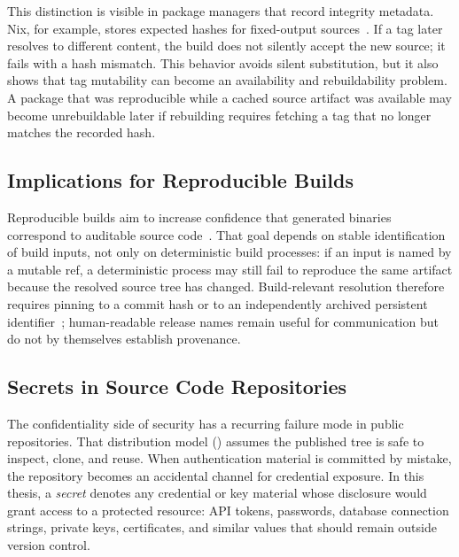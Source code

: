 This distinction is visible in package managers that record integrity metadata.
Nix, for example, stores expected hashes for fixed-output sources~\cite{DBLP:conf/lisa/DolstraJV04}.
If a tag later resolves to different content, the build does not silently accept the new source; it fails with a hash mismatch.
This behavior avoids silent substitution, but it also shows that tag mutability can become an availability and rebuildability problem.
A package that was reproducible while a cached source artifact was available may become unrebuildable later if rebuilding requires fetching a tag that no longer matches the recorded hash.

\subsection{Implications for Reproducible Builds}
\label{subsec:bg-provenance-reproducible-builds}

Reproducible builds aim to increase confidence that generated binaries correspond to auditable source code~\cite{DBLP:journals/software/LambZ22}.
That goal depends on stable identification of build inputs, not only on deterministic build processes: if an input is named by a mutable ref, a deterministic process may still fail to reproduce the same artifact because the resolved source tree has changed.
Build-relevant resolution therefore requires pinning to a commit hash or to an independently archived persistent identifier~\cite{cise-2020-doi}; human-readable release names remain useful for communication but do not by themselves establish provenance.

\subsection{Secrets in Source Code Repositories}
\label{subsec:bg-secrets}

The confidentiality side of security has a recurring failure mode in public repositories.
That distribution model () assumes the published tree is safe to inspect, clone, and reuse.
When authentication material is committed by mistake, the repository becomes an accidental channel for credential exposure.
In this thesis, a \emph{secret} denotes any credential or key material whose disclosure would grant access to a protected resource: API tokens, passwords, database connection strings, private keys, certificates, and similar values that should remain outside version control.

